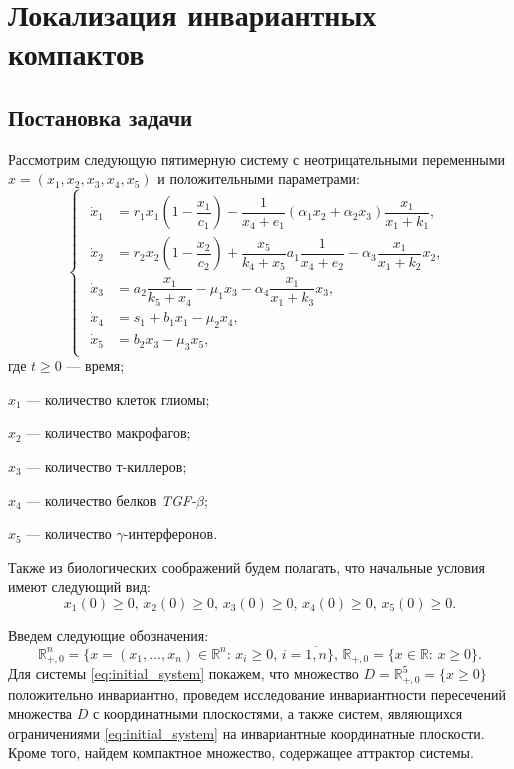 \documentclass[14pt,a4paper]{extarticle}
\begin{document}
	\section{Локализация инвариантных компактов}
	\subsection{Постановка задачи}
	
	Рассмотрим следующую пятимерную систему с неотрицательными переменными $x=(x_1, x_2, x_3, x_4, x_5)$ и положительными параметрами:
	\begin{equation}
		\begin{cases}
			\begin{aligned}
				\dot{x}_1 &= r_1x_1\left(1-\dfrac{x_1}{c_1}\right)-\dfrac{1}{x_4+e_1}(\alpha_1x_2+\alpha_2x_3)\dfrac{x_1}{x_1+k_1},\\
				\dot{x}_2 &= r_2x_2\left(1-\dfrac{x_2}{c_2}\right)+\dfrac{x_5}{k_4+x_5}a_1\dfrac{1}{x_4+e_2}-\alpha_3\dfrac{x_1}{x_1+k_2}x_2,\\
				\dot{x}_3 &= a_2\dfrac{x_1}{k_5+x_4}-\mu_1x_3-\alpha_4\dfrac{x_1}{x_1+k_3}x_3,\\
				\dot{x}_4 &= s_1 + b_1x_1-\mu_2x_4,\\
				\dot{x}_5 &= b_2x_3-\mu_3x_5,
			\end{aligned}
		\end{cases}\label{eq:initial_system}
	\end{equation}
	где $t\ge0$ --- время;
	
	$x_1$ --- количество клеток глиомы;
	
	$x_2$ --- количество макрофагов;
	
	$x_3$ --- количество т-киллеров;
	
	$x_4$ --- количество белков \textit{TGF-}$\beta$;
	
	$x_5$ --- количество $\gamma$-интерферонов. 
	
	Также из биологических соображений будем полагать, что начальные условия имеют следующий вид:
	\begin{equation}\label{eq:conds}
	x_1(0)\ge0,\,x_2(0)\ge0,\,x_3(0)\ge0,\,x_4(0)\ge0,\,x_5(0)\ge0.
	\end{equation}
	
	Введем следующие обозначения:
	\[\mathbb{R}^n_{+,0}=\{x=(x_1,\dots,x_n)\in\mathbb{R}^n:\, x_i\ge0,\, i=\overline{1,n}\},\,\mathbb{R}_{+,0}=\{x\in\mathbb{R}:\, x\ge0\}.\]
	Для системы \ref{eq:initial_system} покажем, что множество $D=\mathbb{R}^{5}_{+,0} = \{x \ge 0\}$ положительно инвариантно, проведем исследование инвариантности пересечений множества $D$ с координатными плоскостями, а также систем, являющихся ограничениями \ref{eq:initial_system} на инвариантные координатные плоскости. Кроме того, найдем компактное множество, содержащее аттрактор системы.
	
\end{document}
